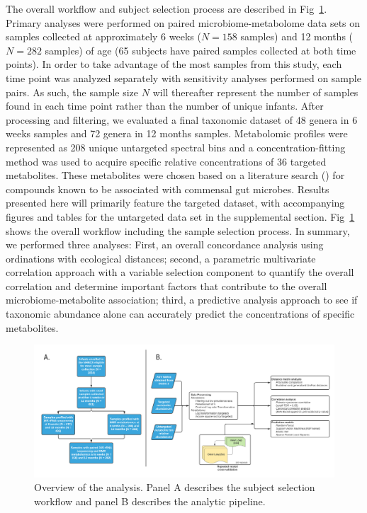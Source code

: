 The overall workflow and subject selection process are described in Fig~\ref{fig:2.1}. Primary analyses were performed on paired microbiome-metabolome data sets on samples collected at approximately 6 weeks ($N = 158$ samples) and 12 months ($N = 282$ samples) of age (65 subjects have paired samples collected at both time points). In order to take advantage of the most samples from this study, each time point was analyzed separately with sensitivity analyses performed on sample pairs. As such, the sample size $N$ will thereafter represent the number of samples found in each time point rather than the number of unique infants. After processing and filtering, we evaluated a final taxonomic dataset of 48 genera in 6 weeks samples and 72 genera in 12 months samples.  Metabolomic profiles were represented as 208 unique untargeted spectral bins and a concentration-fitting method \cite{weljie2006targeted} was used to acquire specific relative concentrations of 36 targeted metabolites. These metabolites were chosen based on a literature search () for compounds known to be associated with commensal gut microbes. Results presented here will primarily feature the targeted dataset, with accompanying figures and tables for the untargeted data set in the supplemental section. Fig~\ref{fig:2.1} shows the overall workflow including the sample selection process. In summary, we performed three analyses: First, an overall concordance analysis using ordinations with ecological distances; second, a parametric multivariate correlation approach with a variable selection component to quantify the overall correlation and determine important factors that contribute to the overall microbiome-metabolite association; third, a predictive analysis approach to see if taxonomic abundance alone can accurately predict the concentrations of specific metabolites.  

\begin{figure}[!h]
    \centering
    \includegraphics[width=\linewidth]{figures/ch2_f1.png}
    \caption[Overview of the analysis]{Overview of the analysis. Panel A describes the subject selection workflow and panel B describes the analytic pipeline.}
    \label{fig:2.1}
\end{figure}

